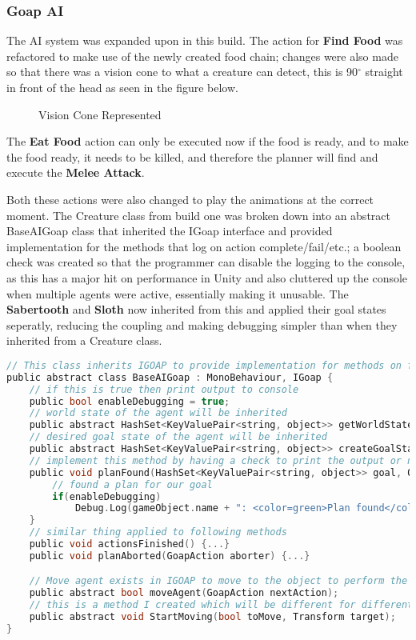 \documentclass[11pt]{report}
\begin{document}
\subsubsection{Goap AI}
The AI system was expanded upon in this build. The action for \textbf{Find Food} was refactored to make use of the newly created food chain; changes were also made so that there was a vision cone to what a creature can detect, this is 90$^{\circ}$ straight in front of the head as seen in the figure below.
\begin{figure}[H]
    \centering
    \caption{Vision Cone Represented}
\end{figure}

The \textbf{Eat Food} action can only be executed now if the food is ready, and to make the food ready, it needs to be killed, and therefore the planner will find and execute the \textbf{Melee Attack}.

Both these actions were also changed to play the animations at the correct moment.
The Creature class from build one was broken down into an abstract BaseAIGoap class that inherited the IGoap interface and provided implementation for the methods that log on action complete/fail/etc.; a boolean check was created so that the programmer can disable the logging to the console, as this has a major hit on performance in Unity and also cluttered up the console when multiple agents were active, essentially making it unusable. The \textbf{Sabertooth} and \textbf{Sloth} now inherited from this and applied their goal states seperatly, reducing the coupling and making debugging simpler than when they inherited from a Creature class.
\begin{lstlisting}[language=c]
// This class inherits IGOAP to provide implementation for methods on finishing the plans.
public abstract class BaseAIGoap : MonoBehaviour, IGoap {
    // if this is true then print output to console
    public bool enableDebugging = true;
    // world state of the agent will be inherited
    public abstract HashSet<KeyValuePair<string, object>> getWorldState(); 
    // desired goal state of the agent will be inherited
    public abstract HashSet<KeyValuePair<string, object>> createGoalState();
    // implement this method by having a check to print the output or not
    public void planFound(HashSet<KeyValuePair<string, object>> goal, Queue<GoapAction> actions) {
        // found a plan for our goal
        if(enableDebugging)
            Debug.Log(gameObject.name + ": <color=green>Plan found</color> " + GoapAgent.prettyPrint(actions));
    }
    // similar thing applied to following methods
    public void actionsFinished() {...}
    public void planAborted(GoapAction aborter) {...}

    // Move agent exists in IGOAP to move to the object to perform the action
    public abstract bool moveAgent(GoapAction nextAction);
    // this is a method I created which will be different for different agents, it performs all the things to start and stop moving the agent.
    public abstract void StartMoving(bool toMove, Transform target);
}
\end{lstlisting}
\end{document}
